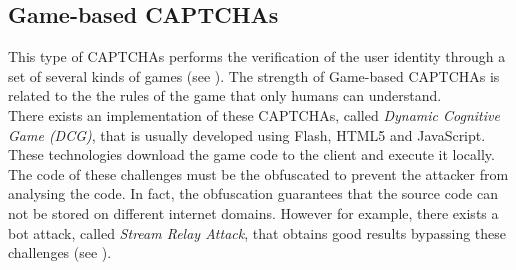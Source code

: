 \subsection{Game-based CAPTCHAs}
This type of CAPTCHAs performs the verification of the user identity through a set of several kinds of games (see ). The strength of Game-based CAPTCHAs is related to the the rules of the game that only humans can understand.\\
There exists an implementation of these CAPTCHAs, called \textit{Dynamic Cognitive Game (DCG)}, that is usually developed using Flash, HTML5 and JavaScript. These technologies download the game code to the client and execute it locally.\\
The code of these challenges must be the obfuscated to prevent the attacker from analysing the code. In fact, the obfuscation guarantees that the source code can not be stored on different internet domains. However for example, there exists a bot attack, called \textit{Stream Relay Attack}, that obtains good results bypassing these challenges \cite{game_CAPTCHA} (see ).
